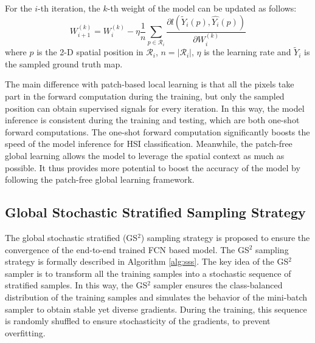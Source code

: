 \documentclass[journal]{IEEEtran}
\begin{document}
For the $i$-th iteration, the $k$-th weight of the model can be updated as follows:
\begin{equation}
  W^{(k)}_{i+1} = W^{(k)}_{i} - \eta \frac{1}{n}\sum_{p \in \mathcal{R}_i}{\frac{\partial{l(\widetilde{Y}_i(p), \hat{Y_i}(p))}}{\partial{W^{(k)}_{i}}}}
\end{equation}
where $p$ is the 2-D spatial position in $\mathcal{R}_i$, $n = |\mathcal{R}_i|$, $\eta$ is the learning rate and $\widetilde{Y}_i$ is the sampled ground truth map.


The main difference with patch-based local learning is that all the pixels take part in the forward computation during the training, but only the sampled position can obtain supervised signals for every iteration.
In this way, the model inference is consistent during the training and testing, which are both one-shot forward computations.
The one-shot forward computation significantly boosts the speed of the model inference for HSI classification.
Meanwhile, the patch-free global learning allows the model to leverage the spatial context as much as possible.
It thus provides more potential to boost the accuracy of the model by following the patch-free global learning framework.






\subsection{Global Stochastic Stratified Sampling Strategy}
\label{sec:gs2_sampler}
The global stochastic stratified (GS$^2$) sampling strategy is proposed to ensure the convergence of the end-to-end trained FCN based model.
The GS$^2$ sampling strategy is formally described in Algorithm \ref{alg:sss}.
The key idea of the GS$^2$ sampler is to transform all the training samples into a stochastic sequence of stratified samples.
In this way, the GS$^2$ sampler ensures the class-balanced distribution of the training samples and simulates the behavior of the mini-batch sampler to obtain stable yet diverse gradients.
During the training, this sequence is randomly shuffled to ensure stochasticity of the gradients, to prevent overfitting.
\end{document}
